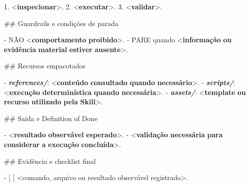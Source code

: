 \documentclass[
  10pt,
  a4paper,
  oneside]{book}
\newenvironment{Shaded}{}{}
\newcommand{\DataTypeTok}[1]{\textcolor[rgb]{0.56,0.13,0.00}{#1}}
\newcommand{\ErrorTok}[1]{\textcolor[rgb]{1.00,0.00,0.00}{\textbf{#1}}}
\newcommand{\FunctionTok}[1]{\textcolor[rgb]{0.02,0.16,0.49}{#1}}
\newcommand{\InformationTok}[1]{\textcolor[rgb]{0.38,0.63,0.69}{\textbf{\textit{#1}}}}
\newcommand{\KeywordTok}[1]{\textcolor[rgb]{0.00,0.44,0.13}{\textbf{#1}}}
\newcommand{\NormalTok}[1]{#1}
\newcommand{\SpecialStringTok}[1]{\textcolor[rgb]{0.73,0.40,0.53}{#1}}
\newcommand{\VariableTok}[1]{\textcolor[rgb]{0.10,0.09,0.49}{#1}}
\renewenvironment{Shaded}{\begin{snugshade}}{\end{snugshade}}%
\begin{document}
\begin{Shaded}
\begin{Highlighting}[]
\SpecialStringTok{1. }\DataTypeTok{\textless{}}\KeywordTok{inspecionar}\DataTypeTok{\textgreater{}}\NormalTok{.}
\SpecialStringTok{2. }\DataTypeTok{\textless{}}\KeywordTok{executar}\DataTypeTok{\textgreater{}}\NormalTok{.}
\SpecialStringTok{3. }\DataTypeTok{\textless{}}\KeywordTok{validar}\DataTypeTok{\textgreater{}}\NormalTok{.}

\FunctionTok{\#\# Guardrails e condições de parada}

\SpecialStringTok{{-} }\NormalTok{NÃO }\DataTypeTok{\textless{}}\KeywordTok{comportamento} \ErrorTok{proibido}\DataTypeTok{\textgreater{}}\NormalTok{.}
\SpecialStringTok{{-} }\NormalTok{PARE quando }\DataTypeTok{\textless{}}\KeywordTok{informação} \ErrorTok{ou} \ErrorTok{evidência} \ErrorTok{material} \ErrorTok{estiver} \ErrorTok{ausente}\DataTypeTok{\textgreater{}}\NormalTok{.}

\FunctionTok{\#\# Recursos empacotados}

\SpecialStringTok{{-} }\InformationTok{\textasciigrave{}references/\textasciigrave{}}\NormalTok{: }\DataTypeTok{\textless{}}\KeywordTok{conteúdo} \ErrorTok{consultado} \ErrorTok{quando} \ErrorTok{necessário}\DataTypeTok{\textgreater{}}\NormalTok{.}
\SpecialStringTok{{-} }\InformationTok{\textasciigrave{}scripts/\textasciigrave{}}\NormalTok{: }\DataTypeTok{\textless{}}\KeywordTok{execução} \ErrorTok{determinística} \ErrorTok{quando} \ErrorTok{necessária}\DataTypeTok{\textgreater{}}\NormalTok{.}
\SpecialStringTok{{-} }\InformationTok{\textasciigrave{}assets/\textasciigrave{}}\NormalTok{: }\DataTypeTok{\textless{}}\KeywordTok{template} \ErrorTok{ou} \ErrorTok{recurso} \ErrorTok{utilizado} \ErrorTok{pela} \ErrorTok{Skill}\DataTypeTok{\textgreater{}}\NormalTok{.}

\FunctionTok{\#\# Saída e Definition of Done}

\SpecialStringTok{{-} }\DataTypeTok{\textless{}}\KeywordTok{resultado} \ErrorTok{observável} \ErrorTok{esperado}\DataTypeTok{\textgreater{}}\NormalTok{.}
\SpecialStringTok{{-} }\DataTypeTok{\textless{}}\KeywordTok{validação} \ErrorTok{necessária} \ErrorTok{para} \ErrorTok{considerar} \ErrorTok{a} \ErrorTok{execução} \ErrorTok{concluída}\DataTypeTok{\textgreater{}}\NormalTok{.}

\FunctionTok{\#\# Evidência e checklist final}

\SpecialStringTok{{-} }\VariableTok{[ ]}\NormalTok{ \textless{}comando, arquivo ou resultado observável registrado\textgreater{}.}
\end{Highlighting}
\end{Shaded}
\end{document}
